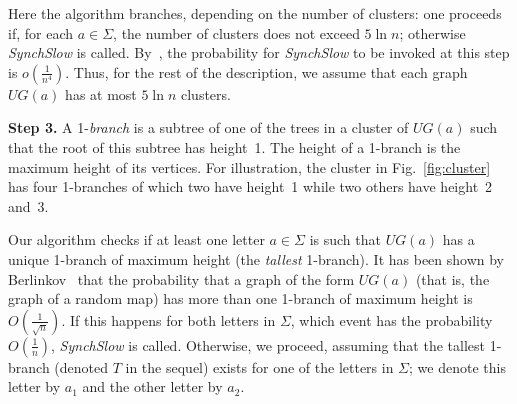 \documentclass{jalc}
\begin{document}
Here the algorithm  branches, depending on the number of clusters: one proceeds if, for each $a\in\Sigma$, the number of clusters does not exceed $5\ln n$; otherwise \emph{SynchSlow} is called. By~\cite[Lemma~2]{Berlinkov:preprint}, the probability for \emph{SynchSlow} to be invoked at this step is $o(\frac{1}{n^4})$. Thus, for the rest of the description, we assume that
each graph $U\!G(a)$ has at most $5\ln n$ clusters.

\smallskip

\textbf{Step 3.} A 1-\emph{branch} is a subtree of one of the trees in a cluster of $U\!G(a)$ such that the root of this subtree has height~1. The height of a 1-branch is the maximum height of its vertices. For illustration, the cluster in Fig.~\ref{fig:cluster} has four 1-branches of which two have height~1 while two others have height~2 and~3.

Our algorithm checks if at least one letter $a\in\Sigma$ is such that $U\!G(a)$ has a unique 1-branch of maximum height (the \emph{tallest} 1-branch). It has been shown by Berlinkov~\cite[Theorem~3]{Berlinkov:tree} that the probability that a graph of the form $U\!G(a)$ (that is, the graph of a random map) has more than one 1-branch of maximum height is $O(\frac1{\sqrt{n}})$. If this happens for both letters in $\Sigma$, which event has the probability $O(\frac1n)$, \emph{SynchSlow} is called. Otherwise, we proceed, assuming that the tallest 1-branch (denoted $T$ in the sequel) exists for one of the letters in $\Sigma$; we denote this letter by $a_1$ and the other letter by $a_2$.

\smallskip
\end{document}

